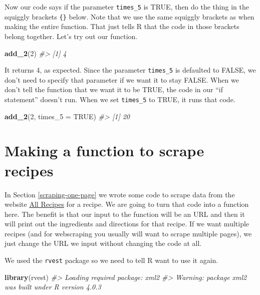 \documentclass[
  12pt,
]{book}
\newenvironment{Shaded}{\begin{snugshade}}{\end{snugshade}}
\newcommand{\CommentTok}[1]{\textcolor[rgb]{0.37,0.37,0.37}{\textit{#1}}}
\newcommand{\DataTypeTok}[1]{\textcolor[rgb]{0.27,0.27,0.27}{#1}}
\newcommand{\DecValTok}[1]{\textcolor[rgb]{0.06,0.06,0.06}{#1}}
\newcommand{\KeywordTok}[1]{\textcolor[rgb]{0.27,0.27,0.27}{\textbf{#1}}}
\newcommand{\NormalTok}[1]{#1}
\newcommand{\OtherTok}[1]{\textcolor[rgb]{0.37,0.37,0.37}{#1}}
\begin{document}
Now our code says if the parameter \texttt{times\_5} is TRUE, then do the thing in the squiggly brackets \texttt{\{\}} below. Note that we use the same squiggly brackets as when making the entire function. That just tells R that the code in those brackets belong together. Let's try out our function.

\begin{Shaded}
\begin{Highlighting}[]
\KeywordTok{add\_2}\NormalTok{(}\DecValTok{2}\NormalTok{)}
\CommentTok{\#\textgreater{} [1] 4}
\end{Highlighting}
\end{Shaded}

It returns 4, as expected. Since the parameter \texttt{times\_5} is defaulted to FALSE, we don't need to specify that parameter if we want it to stay FALSE. When we don't tell the function that we want it to be TRUE, the code in our ``if statement'' doesn't run. When we set \texttt{times\_5} to TRUE, it runs that code.

\begin{Shaded}
\begin{Highlighting}[]
\KeywordTok{add\_2}\NormalTok{(}\DecValTok{2}\NormalTok{, }\DataTypeTok{times\_5 =} \OtherTok{TRUE}\NormalTok{)}
\CommentTok{\#\textgreater{} [1] 20}
\end{Highlighting}
\end{Shaded}

\hypertarget{recipes-function}{%
\section{Making a function to scrape recipes}\label{recipes-function}}

In Section \ref{scraping-one-page} we wrote some code to scrape data from the website \href{https://www.allrecipes.com/}{All Recipes} for a recipe. We are going to turn that code into a function here. The benefit is that our input to the function will be an URL and then it will print out the ingredients and directions for that recipe. If we want multiple recipes (and for webscraping you usually will want to scrape multiple pages), we just change the URL we input without changing the code at all.

We used the \texttt{rvest} package so we need to tell R want to use it again.

\begin{Shaded}
\begin{Highlighting}[]
\KeywordTok{library}\NormalTok{(rvest)}
\CommentTok{\#\textgreater{} Loading required package: xml2}
\CommentTok{\#\textgreater{} Warning: package \textquotesingle{}xml2\textquotesingle{} was built under R version 4.0.3}
\end{Highlighting}
\end{Shaded}
\end{document}
